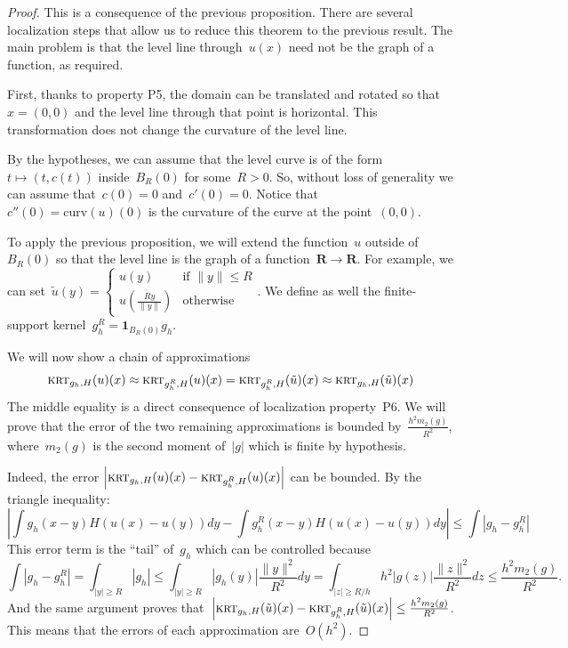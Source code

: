 \documentclass[12pt]{article}                  %
\begin{document}
\begin{proof}
	This is a consequence of the previous proposition.
	There are several localization steps that allow us to reduce this theorem
	to the previous result.  The main problem is that the level line
	through~$u(x)$ need not be the graph of a function, as required.

	First, thanks to property P5, the domain can be translated and rotated so
	that~$x=(0,0)$ and the level line through that point is horizontal.  This
	transformation does not change the curvature of the level line.

	By the hypotheses, we can assume that the level curve
	is of the form~$t\mapsto(t,c(t))$ inside~$B_R(0)$ for some~$R>0$.
	So, without loss of generality we can assume that~$c(0)=0$ and~$c'(0)=0$.
	Notice that~$c''(0)=\mathrm{curv}(u)(0)$ is the curvature of the curve at
	the point~$(0,0)$.

	To apply the previous proposition, we will extend the function~$u$ outside
	of~$B_R(0)$ so that the level line is the graph of a
	function~$\mathbf{R}\to\mathbf{R}$.  For example, we can set~$\tilde
	u(y)=\begin{cases}u(y)&\textrm{if }\|y\|\le
	R\\u\left(\frac{Ry}{\|y\|}\right)&\textrm{otherwise}\end{cases}$.
	We define as well the finite-support kernel~$g_h^R=\mathbf{1}_{B_R(0)}g_h$.

	We will now show a chain of approximations
	\[
	 \textsc{krt}_{g_h,H}(u)(x)
	 \approx
	 \textsc{krt}_{g^R_h,H}(u)(x)
	 =
	 \textsc{krt}_{g^R_h,H}(\tilde u)(x)
	 \approx
	 \textsc{krt}_{g_h,H}(\tilde u)(x)
	\]
	The middle equality is a direct consequence of localization property~P6.
	We will prove that the error of the two remaining approximations is
	bounded by~$\frac{h^2 m_2(g)}{R^2}$,
	where~$m_2(g)$ is the second moment of~$|g|$ which is finite by
	hypothesis.

	Indeed, the
	error $\left|\textsc{krt}_{g_h,H}(u)(x)-\textsc{krt}_{g_h^R,H}(u)(x)\right|$
	can be bounded.
	By the triangle inequality:
	\[
		\left|
		\int g_h(x-y)H(u(x)-u(y))dy
		-
		\int g_h^R(x-y)H(u(x)-u(y))dy
		\right|
		\le
		\int
		\left|
		g_h
		-g_h^R
		\right|
	\]
	This error term is the ``tail'' of~$g_h$ which can be controlled because
	\[
		\int
		\left|
		g_h
		-g_h^R
		\right|
		=
		\int_{|y|\ge R} \left|g_h\right|
		\le
		\int_{|y|\ge R} \left|g_h(y)\right|\frac{\|y\|^2}{R^2}dy
		=
		\int_{|z|\ge R/h} h^2\left|g(z)\right|\frac{\|z\|^2}{R^2}dz
		\le
		\frac{h^2m_2(g)}{R^2}.
	\]
	And the same argument proves that~$\left|\textsc{krt}_{g_h,H}(\tilde
	u)(x)-\textsc{krt}_{g_h^R,H}(\tilde u)(x)\right|\le\frac{h^2m_2(g)}{R^2}$.
	This means that the errors of each approximation are~$O(h^2)$.


\end{proof}
\end{document}
